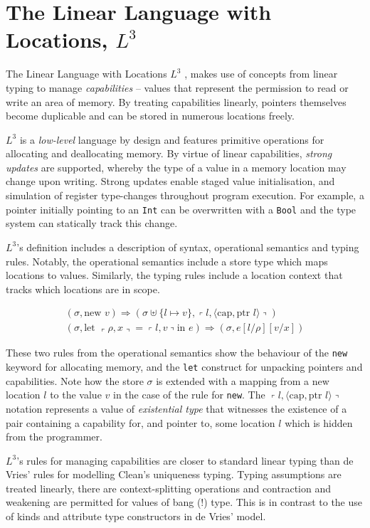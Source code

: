 \documentclass[]{unswthesis}
\newcommand{\lquine}{\left\ulcorner}
\newcommand{\rquine}{\right\urcorner}
\newcommand{\capa}{\text{cap}}
\newcommand{\ptr}{\text{ptr }}
\let\c\texttt
\begin{document}
\section{The Linear Language with Locations, $L^3$}

The Linear Language with Locations $L^3$ \cite{ahmed05}, makes use of concepts from linear typing to manage \textit{capabilities} -- values that represent the permission to read or write an area of memory. By treating capabilities linearly, pointers themselves become duplicable and can be stored in numerous locations freely.

$L^3$ is a \textit{low-level} language by design and features primitive operations for allocating and deallocating memory. By virtue of linear capabilities, \textit{strong updates} are supported, whereby the type of a value in a memory location may change upon writing. Strong updates enable staged value initialisation, and simulation of register type-changes throughout program execution. For example, a pointer initially pointing to an \c{Int} can be overwritten with a \c{Bool} and the type system can statically track this change.

$L^3$'s definition includes a description of syntax, operational semantics and typing rules. Notably, the operational semantics include a store type which maps locations to values. Similarly, the typing rules include a location context that tracks which locations are in scope.

\begin{eqnarray*}
(\sigma, \text{new } v) \Rightarrow (\sigma \uplus \{l \mapsto v\},
	\lquine l, \langle \capa, \ptr l \rangle \rquine)
\\
(\sigma, \text{let } \lquine \rho, x \rquine = \lquine l, v \rquine \text{in } e)
	\Rightarrow
	(\sigma, e[l/\rho][v/x])
\end{eqnarray*}

These two rules from the operational semantics show the behaviour of the \c{new} keyword for allocating memory, and the \c{let} construct for unpacking pointers and capabilities. Note how the store $\sigma$ is extended with a mapping from a new location $l$ to the value $v$ in the case of the rule for \c{new}. The $\lquine l, \langle \capa, \ptr l \rangle \rquine$ notation represents a value of \textit{existential type} that witnesses the existence of a pair containing a capability for, and pointer to, some location $l$ which is hidden from the programmer.

$L^3$'s rules for managing capabilities are closer to standard linear typing than de Vries' rules for modelling Clean's uniqueness typing. Typing assumptions are treated linearly, there are context-splitting operations and contraction and weakening are permitted for values of bang (!) type. This is in contrast to the use of kinds and attribute type constructors in de Vries' model.
\end{document}
